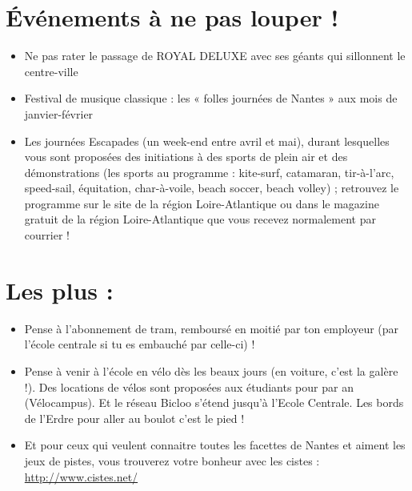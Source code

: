 \section{Événements à ne pas louper !}\trad
\begin{itemize}
  \item Ne pas rater le passage de ROYAL DELUXE avec ses géants qui sillonnent le centre-ville
  \item Festival de musique classique : les « folles journées de Nantes » aux mois de janvier-février
  \item Les journées Escapades (un week-end entre avril et mai), durant lesquelles vous sont proposées des initiations à des sports de plein air et des démonstrations (les sports au programme : kite-surf, catamaran, tir-à-l'arc, speed-sail, équitation, char-à-voile, beach soccer, beach volley) ; retrouvez le programme sur le site de la région Loire-Atlantique ou dans le magazine gratuit de la région Loire-Atlantique que vous recevez normalement par courrier !
\end{itemize}

\section{Les plus :}\trad
\begin{itemize}
  \item Pense à l'abonnement de tram, remboursé en moitié par ton employeur (par l'école centrale si tu es embauché par celle-ci) !
  \item Pense à venir à l'école en vélo dès les beaux jours (en voiture, c'est la galère !). Des locations de vélos sont proposées aux étudiants pour  par an (Vélocampus). Et le réseau Bicloo s'étend jusqu'à l'Ecole Centrale. Les bords de l'Erdre pour aller au boulot c'est le pied !
  \item Et pour ceux qui veulent connaitre toutes les facettes de Nantes et aiment les jeux de pistes, vous trouverez votre bonheur avec les cistes : \url{http://www.cistes.net/}
\end{itemize}



